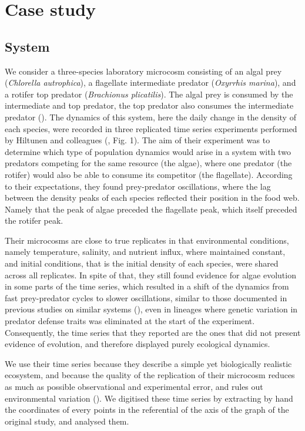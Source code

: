 \documentclass[11pt, oneside]{article}
\begin{document}
\section{Case study}

\subsection{System}

We consider a three-species laboratory microcosm consisting of an algal prey (\textit{Chlorella autrophica}), a flagellate intermediate predator (\textit{Oxyrrhis marina}), and a rotifer top predator (\textit{Brachionus plicatilis}).
The algal prey is consumed by the intermediate and top predator, the top predator also consumes the intermediate predator (\cite{Arndt1993}).
The dynamics of this system, here the daily change in the density of each species, were recorded in three replicated time series experiments performed by Hiltunen and colleagues (\cite{Hiltunen2013}, Fig. 1).
The aim of their experiment was to determine which type of population dynamics would arise in a system with two predators competing for the same resource (the algae), where one predator (the rotifer) would also be able to consume its competitor (the flagellate).
According to their expectations, they found prey-predator oscillations, where the lag between the density peaks of each species reflected their position in the food web.
Namely that the peak of algae preceded the flagellate peak, which itself preceded the rotifer peak.

Their microcosms are close to true replicates in that environmental conditions, namely temperature, salinity, and nutrient influx, where maintained constant, and initial conditions, that is the initial density of each species, were shared across all replicates. 
In spite of that, they still found evidence for algae evolution in some parts of the time series, which resulted in a shift of the dynamics from fast prey-predator cycles to slower oscillations, similar to those documented in previous studies on similar systems (\cite{Yoshida2003, Becks2010}), even in lineages where genetic variation in predator defense traits was eliminated at the start of the experiment. 
Consequently, the time series that they reported are the ones that did not present evidence of evolution, and therefore displayed purely ecological dynamics.

We use their time series because they describe a simple yet biologically realistic ecosystem, and because the quality of the replication of their microcosm reduces as much as possible observational and experimental error, and rules out environmental variation (\cite{Hiltunen2013}).
We digitised these time series by extracting by hand the coordinates of every points in the referential of the axis of the graph of the original study, and analysed them.
\end{document}
